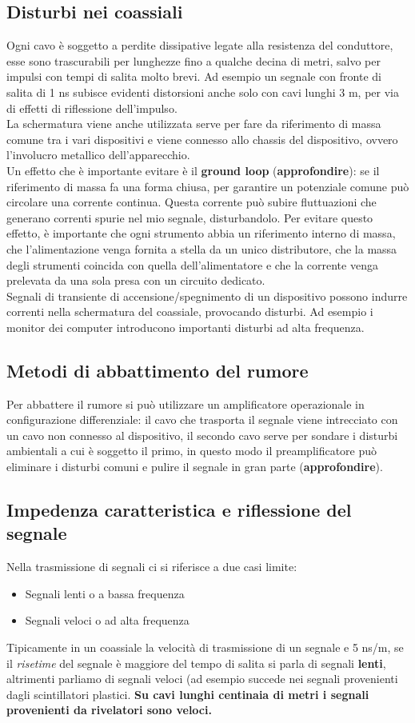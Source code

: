 \subsection{Disturbi nei coassiali}
Ogni cavo \`e soggetto a perdite dissipative legate alla resistenza del conduttore, esse sono trascurabili per lunghezze fino a qualche
decina di metri, salvo per impulsi con tempi di salita molto brevi.
Ad esempio un segnale con fronte di salita di 1 ns subisce evidenti distorsioni anche solo con cavi lunghi 3 m, per via di effetti di
riflessione dell'impulso.\\
La schermatura viene anche utilizzata serve per fare da riferimento di massa comune tra i vari dispositivi e viene connesso allo
chassis del dispositivo, ovvero l'involucro metallico dell'apparecchio.\\
Un effetto che \`e importante evitare \`e il \textbf{ground loop} (\textbf{approfondire}):
se il riferimento di massa fa una forma chiusa, per garantire un potenziale comune pu\`o circolare una corrente continua.
Questa corrente pu\`o subire fluttuazioni che generano correnti spurie nel mio segnale, disturbandolo.
Per evitare questo effetto, \`e importante che ogni strumento abbia un riferimento interno di massa, che l'alimentazione venga fornita
a stella da un unico distributore, che la massa degli strumenti coincida con quella dell'alimentatore e che la corrente venga prelevata
da una sola presa con un circuito dedicato.\\
Segnali di transiente di accensione/spegnimento di un dispositivo possono indurre correnti nella schermatura del coassiale,
provocando disturbi. 
Ad esempio i monitor dei computer introducono importanti disturbi ad alta frequenza.\\
\subsection{Metodi di abbattimento del rumore}
Per abbattere il rumore si pu\`o utilizzare un amplificatore operazionale in configurazione differenziale:
il cavo che trasporta il segnale viene intrecciato con un cavo non connesso al dispositivo, il secondo cavo serve per sondare i disturbi
ambientali a cui \`e soggetto il primo, in questo modo il preamplificatore pu\`o eliminare i disturbi comuni e pulire il segnale in gran parte (\textbf{approfondire}).
\subsection{Impedenza caratteristica e riflessione del segnale}
Nella trasmissione di segnali ci si riferisce a due casi limite:
\begin{itemize}
\item Segnali lenti o a bassa frequenza
\item Segnali veloci o ad alta frequenza
\end{itemize}
Tipicamente in un coassiale la velocit\`a di trasmissione di un segnale e 5 ns/m, se il \textit{risetime} del segnale \`e maggiore del tempo
di salita si parla di segnali \textbf{lenti}, altrimenti parliamo di segnali veloci (ad esempio succede nei segnali provenienti dagli scintillatori plastici.
\textbf{Su cavi lunghi centinaia di metri i segnali provenienti da rivelatori sono veloci.}
